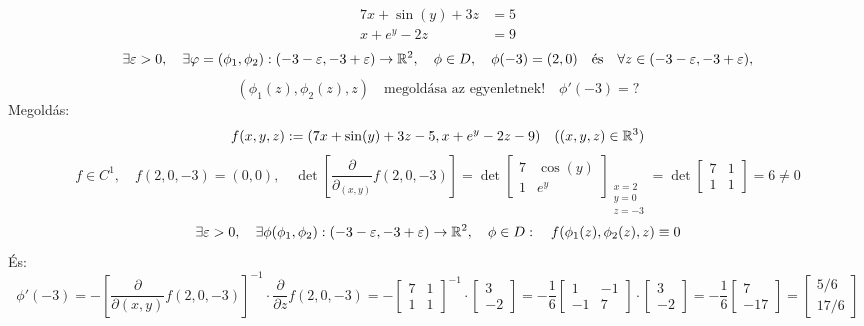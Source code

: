 \documentclass[a4paper,11.5pt]{article}
\begin{document}
	\begin{task}
		 \begin{align*}
			7x+\sin(y)+3z&=5\\
			x+e^y-2z&=9
		\end{align*}
		\[ \exists\varepsilon>0,\quad \exists\varphi=(\phi_1,\phi_2):(-3-\varepsilon,-3+\varepsilon)\to\mathbb{R}^2,\quad \phi\in D,\quad \phi(-3)=(2,0)\quad \text{és}\quad \forall z\in(-3-\varepsilon,-3+\varepsilon), \]
		\[(\phi_1(z),\phi_2(z),z)\quad \text{megoldása az egyenletnek!}\quad \phi'(-3)=?  \]
		Megoldás:
		\[ f(x,y,z):=(7x+\sin(y)+3z-5,x+e^y-2z-9)\quad ((x,y,z)\in\mathbb{R}^3) \]
		\[ f\in C^1,\quad f(2,0,-3)=(0,0),\quad \det\left[\frac{\partial}{\partial_{(x,y)}}f(2,0,-3)\right]=\det \begin{bmatrix}
			7&\cos(y)\\
			1&e^y
		\end{bmatrix}_{\substack{x=2\\y=0\\z=-3}}=\det \begin{bmatrix}
			7&1\\
			1&1
		\end{bmatrix}=6\not=0 \]
		\[ \exists\varepsilon>0,\quad \exists\phi(\phi_1,\phi_2):(-3-\varepsilon,-3+\varepsilon)\to\mathbb{R}^2,\quad \phi\in D:\quad f(\phi_1(z),\phi_2(z),z)\equiv0 \]
		És:
		\[ \phi'(-3)=-\left[\frac{\partial}{\partial(x,y)}f(2,0,-3)\right]^{-1}\cdot\frac{\partial}{\partial z}f(2,0,-3)=-\begin{bmatrix}
			7&1\\
			1&1
		\end{bmatrix}^{-1}\cdot \begin{bmatrix}
		3\\
		-2
		\end{bmatrix}=-\frac{1}{6} \begin{bmatrix}
			1&-1\\
			-1&7
		\end{bmatrix} \cdot \begin{bmatrix}
			3\\
			-2
		\end{bmatrix}=-\frac{1}{6} \begin{bmatrix}
			7\\
			-17
		\end{bmatrix}= \begin{bmatrix}
		5/6\\
		17/6
		\end{bmatrix} \]
	\end{task}
\end{document}
